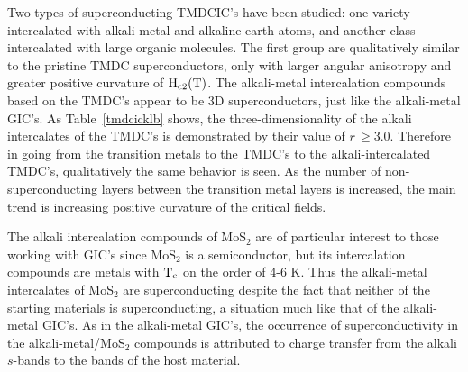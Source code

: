         Two  types of   superconducting TMDCIC's have   been  studied:  one
variety  intercalated  with  alkali  metal and   alkaline  earth atoms, and
another class  intercalated with large  organic molecules.  The first group
are qualitatively  similar to the  pristine TMDC superconductors, only with
larger   angular   anisotropy  and  greater  positive   curvature  of  $\rm
H_{c2}(T)$.\cite{woollam76} The alkali-metal  intercalation compounds based
on the TMDC's appear to be 3D  superconductors, just  like the alkali-metal
GIC's.\cite{tanuma81}   As       Table~\ref{tmdcicklb}     shows,       the
three-dimensionality   of  the    alkali   intercalates  of the  TMDC's  is
demonstrated by  their  value of $r \, \geq  3.0$.  Therefore in going from
the  transition  metals to  the TMDC's  to  the alkali-intercalated TMDC's,
qualitatively   the   same behavior     is seen.  As       the   number  of
non-superconducting  layers  between   the   transition  metal    layers is
increased, the main trend is  increasing positive curvature of the critical
fields.


        The alkali intercalation   compounds of  MoS$_2$ are  of particular
interest to those working with GIC's  since MoS$_2$ is a semiconductor, but
its intercalation compounds are metals with  $\rm  T_c$ on the order of 4-6
K.\cite{somoano73}  Thus  the alkali-metal    intercalates of   MoS$_2$ are
superconducting despite the fact that  neither of the starting materials is
superconducting,   a   situation  much   like  that  of  the   alkali-metal
GIC's.\cite{hannay65}   As in the  alkali-metal   GIC's,  the occurrence of
superconductivity in the alkali-metal/MoS$_2$  compounds  is  attributed to
charge transfer  from   the  alkali $s$-bands to   the  bands  of  the host
material.\cite{somoano73}

